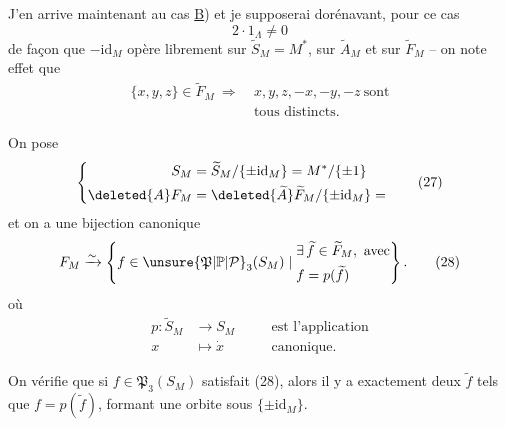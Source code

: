 J'en arrive maintenant au cas \uline{B})
et je supposerai dorénavant, pour ce cas
\[
\boxed{2\cdot1_\Lambda\ne0}\tag*{(25)}
\]
de façon que  $-\mathrm{id}_M$ opère librement sur
$\widetilde S_M=M^*$, sur $\widetilde A_M$ et sur $\widetilde F_M$ -- on
note  effet que
\[
\begin{aligned}
\{x,y,z\}\in\widetilde F_M\ \Longrightarrow\ &x,y,z,-x,-y,-z\ \text{sont}\\
&\text{tous distincts}.
\end{aligned}\tag*{(26)}
\]

On pose
\[
\left\{\begin{aligned}
S_M&=\widetilde S_M/\{\pm\mathrm{id}_M\}=M^*/\{\pm1\}\\
\deleted{A}F_M&=\deleted{\widetilde A}\widetilde F_M/\{\pm\mathrm{id}_M\}=
\end{aligned}\right.\tag*{(27)}
\]
et on a une bijection canonique
\[
F_M\xrightarrow{\sim}\left\{f\in\unsure{\mathfrak P|\mathbb P|\mathcal P}_3(S_M)\mid
\begin{aligned}&\exists\,\widetilde f\in\widetilde F_M,\ \text{avec}\\
&f=p(\widetilde f)\end{aligned}\right\}.\tag*{(28)}
\]
où
\[
\begin{aligned}p:\widetilde S_M&\longrightarrow S_M&\quad&\text{est l'application}\\
x&\longmapsto\dot x&&\text{canonique}.\end{aligned}\tag*{(29)}
\]

On vérifie  que si $f\in\mathfrak P_3(S_M)$
satisfait (28), alors il y a exactement deux
$\widetilde f$ tels que $f=p(\widetilde f)$, formant une orbite sous
$\{\pm\mathrm{id}_M\}$.
